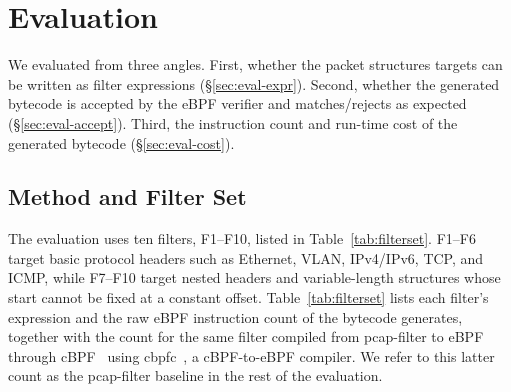 \section{Evaluation}
\label{sec:eval}

We evaluated \kunai from three angles. First, whether the packet
structures \kunai targets can be written as filter expressions
(\S\ref{sec:eval-expr}). Second, whether the generated bytecode is
accepted by the eBPF verifier and matches/rejects as expected
(\S\ref{sec:eval-accept}). Third, the instruction count and run-time
cost of the generated bytecode (\S\ref{sec:eval-cost}).

\subsection{Method and Filter Set}
\label{sec:eval-method}

The evaluation uses ten filters, F1--F10, listed in Table~\ref{tab:filterset}. F1--F6 target basic protocol
headers such as Ethernet, VLAN, IPv4/IPv6, TCP, and ICMP, while
F7--F10 target nested headers and variable-length structures whose
start cannot be fixed at a constant offset. Table~\ref{tab:filterset} lists each filter's
\kunai expression and the raw eBPF instruction count of the bytecode
\kunai generates, together with the count for the same filter compiled
from pcap-filter to eBPF through cBPF~\cite{mccanne1993bpf} using
cbpfc~\cite{cloudflare_cbpfc}, a cBPF-to-eBPF compiler. We refer to this latter count as the
pcap-filter baseline in the rest of the evaluation.

